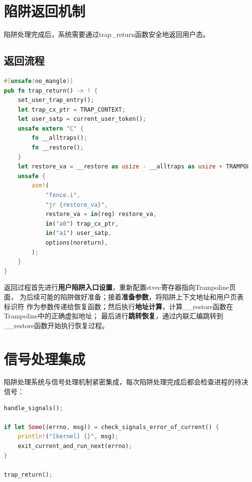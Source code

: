 \section{陷阱返回机制}

陷阱处理完成后，系统需要通过trap\_return函数安全地返回用户态。

\subsection{返回流程}

\begin{lstlisting}[language=Rust,caption={陷阱返回实现}, label={lst:trap-return}]
#[unsafe(no_mangle)]
pub fn trap_return() -> ! {
    set_user_trap_entry();
    let trap_cx_ptr = TRAP_CONTEXT;
    let user_satp = current_user_token();
    unsafe extern "C" {
        fn __alltraps();
        fn __restore();
    }
    let restore_va = __restore as usize - __alltraps as usize + TRAMPOLINE;
    unsafe {
        asm!(
            "fence.i",
            "jr {restore_va}",
            restore_va = in(reg) restore_va,
            in("a0") trap_cx_ptr,
            in("a1") user_satp,
            options(noreturn),
        );
    }
}
\end{lstlisting}

返回过程首先进行\textbf{用户陷阱入口设置}，重新配置stvec寄存器指向Trampoline页面，
为后续可能的陷阱做好准备；接着\textbf{准备参数}，将陷阱上下文地址和用户页表标识符
作为参数传递给恢复函数；然后执行\textbf{地址计算}，计算\_\_restore函数在Trampoline中的正确虚拟地址；
最后进行\textbf{跳转恢复}，通过内联汇编跳转到\_\_restore函数开始执行恢复过程。

\section{信号处理集成}

陷阱处理系统与信号处理机制紧密集成，每次陷阱处理完成后都会检查进程的待决信号：

\begin{lstlisting}[language=Rust,caption={信号处理集成}, label={lst:signal-integration}]
handle_signals();

if let Some((errno, msg)) = check_signals_error_of_current() {
    println!("[kernel] {}", msg);
    exit_current_and_run_next(errno);
}

trap_return();
\end{lstlisting}
